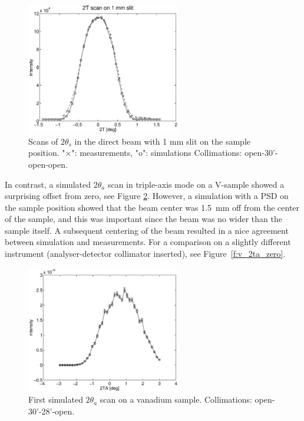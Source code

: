\begin{figure}
  \begin{center}
    \includegraphics[width=0.6\textwidth]{figures/tas1-2T.eps}
  \end{center}
\caption{Scans of $2\theta_s$ in the direct beam with 1 mm slit on the
  sample position.
"$\times$": measurements, "o": simulations  
Collimations: open-30'-open-open.}
\label{f:2t_direct}
\end{figure}

In contrast, a simulated $2\theta_a$ scan in triple-axis 
mode on a V-sample showed a surprising offset from zero, see
Figure \ref{f:v_2ta_offset}. However, a simulation with a PSD
on the sample position showed that the beam center was 1.5~mm
off from the center of the sample, and this was important
since the beam was no wider than the sample itself.
A subsequent centering of the beam resulted in a nice
agreement between simulation and measurements. 
For a comparison on a slightly different instrument
(analyser-detector collimator inserted), 
see Figure~\ref{f:v_2ta_zero}.

\begin{figure}
  \begin{center}
    \includegraphics[width=0.6\textwidth]{figures/vanadium-plot-1.eps}
  \end{center}
\caption{First simulated $2\theta_a$ scan on a vanadium sample.
Collimations: open-30'-28'-open.}
\label{f:v_2ta_offset}
\end{figure}

